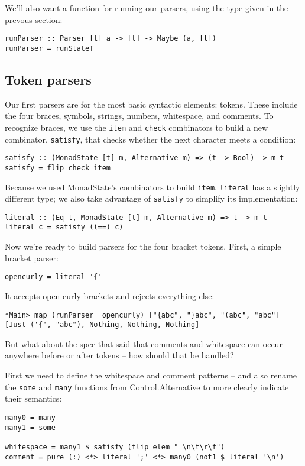 \documentclass{tmr}
\begin{document}
We'll also want a function for running our parsers, using the type given in the
prevous section:
\begin{verbatim}
runParser :: Parser [t] a -> [t] -> Maybe (a, [t])
runParser = runStateT
\end{verbatim}

\subsection{Token parsers}
Our first parsers are for the most basic syntactic elements:  tokens.
These include the four braces, symbols, strings, numbers, whitespace, and comments.
To recognize braces, we use the \verb+item+ and \verb+check+ 
combinators to build a new combinator, \verb+satisfy+, that checks whether 
the next character meets a condition:
\begin{verbatim}
satisfy :: (MonadState [t] m, Alternative m) => (t -> Bool) -> m t
satisfy = flip check item
\end{verbatim}

Because we used MonadState's combinators to build \verb+item+, \verb+literal+ 
has a slightly different type; we also take advantage of \verb+satisfy+ to 
simplify its implementation:
\begin{verbatim}
literal :: (Eq t, MonadState [t] m, Alternative m) => t -> m t
literal c = satisfy ((==) c)
\end{verbatim}

Now we're ready to build parsers for the four bracket tokens.  
First, a simple bracket parser:
\begin{verbatim}
opencurly = literal '{'
\end{verbatim}

It accepts open curly brackets and rejects everything else:
\begin{verbatim}
*Main> map (runParser  opencurly) ["{abc", "}abc", "(abc", "abc"]
[Just ('{', "abc"), Nothing, Nothing, Nothing]
\end{verbatim}

But what about the spec that said that comments and whitespace can occur 
anywhere before or after tokens -- how should that be handled?

First we need to define the whitespace and comment patterns -- and also rename
the \verb+some+ and \verb+many+ functions from Control.Alternative to more
clearly indicate their semantics:
\begin{verbatim}
many0 = many
many1 = some

whitespace = many1 $ satisfy (flip elem " \n\t\r\f")
comment = pure (:) <*> literal ';' <*> many0 (not1 $ literal '\n')
\end{verbatim}
\end{document}
